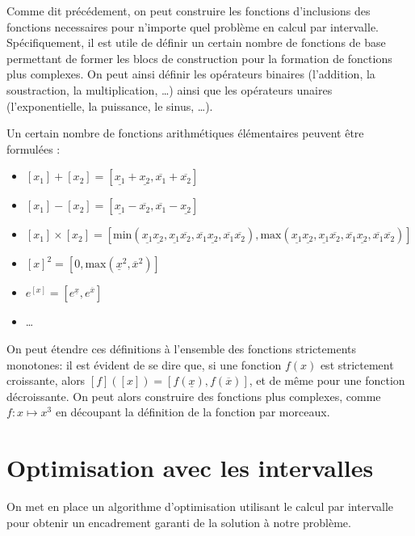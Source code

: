 Comme dit précédement, on peut construire les fonctions d'inclusions des fonctions necessaires pour n'importe quel problème en calcul par intervalle. Spécifiquement, il est utile de définir un certain nombre de fonctions de base permettant de former les blocs de construction pour la formation de fonctions plus complexes. On peut ainsi définir les opérateurs binaires (l'addition, la soustraction, la multiplication, \dots) ainsi que les opérateurs unaires (l'exponentielle, la puissance, le sinus, \dots).

\begin{ex}
  
  Un certain nombre de fonctions arithmétiques élémentaires peuvent être formulées :
  \begin{itemize}
    \item $[x_1] + [x_2] = [\underline{x_1} + \underline{x_2}, \overline{x_1} + \overline{x_2}]$
    \item $[x_1] - [x_2] = [\underline{x_1} - \overline{x_2}, \overline{x_1} - \underline{x_2}]$
    \item $[x_1] \times [x_2] = [\text{min}(\underline{x_1}\underline{x_2}, \underline{x_1}\overline{x_2}, \overline{x_1}\underline{x_2}, \overline{x_1}\overline{x_2}), \text{max}(\underline{x_1}\underline{x_2}, \underline{x_1}\overline{x_2}, \overline{x_1}\underline{x_2}, \overline{x_1}\overline{x_2})]$
    \item $[x]^2 = [0, \text{max}(\underline{x}^2, \overline{x}^2)]$
    \item $e^{[x]} = [e^{\underline{x}}, e^{\overline{x}}]$
    \item \dots
  \end{itemize}
\end{ex}

On peut étendre ces définitions à l'ensemble des fonctions strictements monotones: il est évident de se dire que, si une fonction $f(x)$ est strictement croissante, alors $[f]([x]) = [f(\underline{x}), f(\overline{x})]$, et de même pour une fonction décroissante. On peut alors construire des fonctions plus complexes, comme $f : x \mapsto x^3$ en découpant la définition de la fonction par morceaux.

\section{Optimisation avec les intervalles}
On met en place un algorithme d'optimisation utilisant le calcul par intervalle pour obtenir un encadrement garanti de la solution à notre problème.

